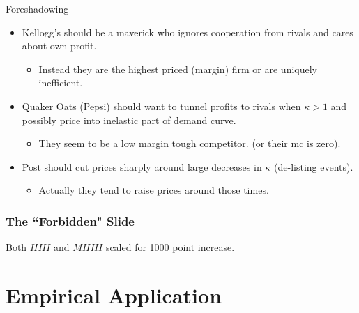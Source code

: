 \documentclass[handout, serif, aspectratio=169, 10pt]{beamer}
\begin{document}
\begin{frame}{Foreshadowing}
\begin{itemize}
\item Kellogg's should be a \alert{maverick} who ignores cooperation from rivals and cares about own profit.
\begin{itemize}
\item Instead they are the highest priced (margin) firm or are uniquely inefficient.
\end{itemize}
\item Quaker Oats (Pepsi) should want to \alert{tunnel} profits to rivals when $\kappa > 1$ and possibly price into inelastic part of demand curve.
\begin{itemize}
\item They seem to be a low margin tough competitor. (or their mc is zero).
\end{itemize}
\item Post should \alert{cut prices} sharply around large decreases in $\kappa$ (de-listing events).
\begin{itemize}
\item Actually they tend to \alert{raise prices} around those times.
\end{itemize}
\end{itemize}
\end{frame}



\begin{frame}[plain]
\frametitle{The ``Forbidden" Slide}
\begin{center}
\scalebox{.6}{}
\end{center}
\scriptsize Both $HHI$ and $MHHI$ scaled for 1000 point increase.
\end{frame}

\section{Empirical Application}
\end{document}
